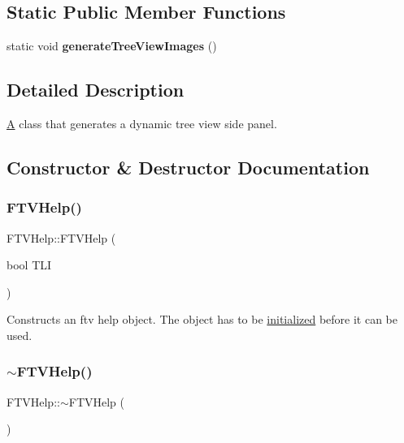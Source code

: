\subsection*{Static Public Member Functions}
\begin{DoxyCompactItemize}
\item 
\mbox{\label{class_f_t_v_help_a9e858dee960cc0e73c2d269171dd17a7}} 
static void {\bfseries generate\+Tree\+View\+Images} ()
\end{DoxyCompactItemize}


\subsection{Detailed Description}
\mbox{\hyperlink{class_a}{A}} class that generates a dynamic tree view side panel. 

\subsection{Constructor \& Destructor Documentation}
\mbox{\label{class_f_t_v_help_a7e7d72cccba33233dd89c6280b9ca101}} 
\subsubsection{\texorpdfstring{FTVHelp()}{FTVHelp()}}
{\footnotesize\ttfamily F\+T\+V\+Help\+::\+F\+T\+V\+Help (\begin{DoxyParamCaption}\item[{bool}]{T\+LI }\end{DoxyParamCaption})}

Constructs an ftv help object. The object has to be \mbox{\hyperlink{class_f_t_v_help_a791c63d8c0dc72e7fedc4f17163dbfa3}{initialized}} before it can be used. \mbox{\label{class_f_t_v_help_aacb475096471a3b51feb4b247a41e27c}} 
\subsubsection{\texorpdfstring{$\sim$FTVHelp()}{~FTVHelp()}}
{\footnotesize\ttfamily F\+T\+V\+Help\+::$\sim$\+F\+T\+V\+Help (\begin{DoxyParamCaption}{ }\end{DoxyParamCaption})}

